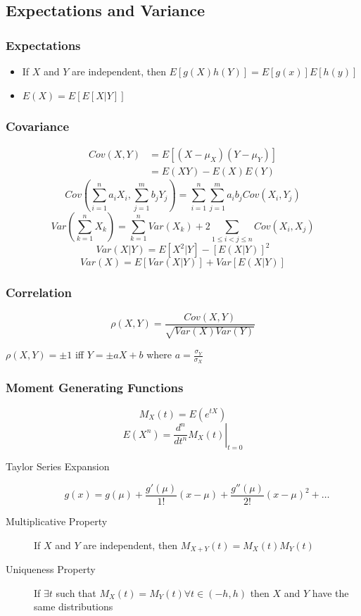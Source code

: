 \documentclass{article}
\begin{document}
\begin{multicols}{2}
\subsection{Expectations and Variance}
\subsubsection*{Expectations}
\begin{itemize}
 \item If $X$ and $Y$ are independent, then $E[g(X)h(Y)] = E[g(x)]E[h(y)]$
 \item $E(X) = E[E[X|Y]]$
\end{itemize}

\subsubsection*{Covariance}
\begin{equation*}
\begin{split}
 Cov(X,Y) &= E[(X-\mu_X)(Y-\mu_Y)]\\
 &= E(XY)-E(X)E(Y)
\end{split}
\end{equation*}
$$Cov\left(\sum_{i=1}^n a_iX_i, \sum_{j=1}^m b_jY_j\right) = \sum_{i=1}^n\sum_{j=1}^m a_ib_jCov(X_i,Y_j)$$
$$Var\left(\sum_{k=1}^{n}X_k\right) = \sum_{k=1}^{n}Var(X_k) + 2\sum_{1\leq i<j \leq n}Cov(X_i,X_j)$$
$$Var(X|Y) = E[X^2|Y] - [E(X|Y)]^2$$
$$Var(X) = E[Var(X|Y)] + Var[E(X|Y)]$$
\subsubsection*{Correlation}
$$\rho(X,Y) = \frac{Cov(X,Y)}{\sqrt{Var(X)Var(Y)}}$$
\begin{center}
 $\rho(X,Y) = \pm 1$ iff $Y = \pm aX + b$ where $a =\frac{\sigma_Y}{\sigma_X}$
\end{center}

\subsubsection*{Moment Generating Functions}
$$M_{X}(t) = E(e^{tX})$$
$$E(X^n) = \left.\frac{d^n}{dt^n}M_{X}(t)\right|_{t=0}$$
\begin{description}
\item[Taylor Series Expansion] $$g(x) = g(\mu) + \frac{g'(\mu)}{1!}(x-\mu) + \frac{g''(\mu)}{2!}(x-\mu)^2 + \dots$$
\item[Multiplicative Property] If $X$ and $Y$ are independent, then $M_{X+Y}(t) = M_X(t)M_Y(t)$
\item[Uniqueness Property] If $\exists t$ such that $M_X(t) = M_Y(t) \forall t \in(-h,h)$ then $X$ and $Y$ have the same distributions
\end{description}

\end{multicols}
\end{document}
